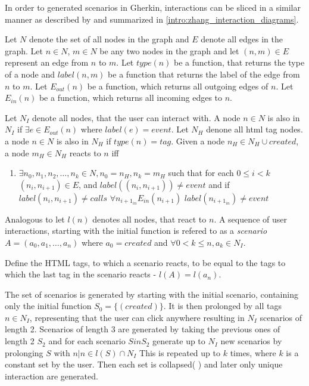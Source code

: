 In order to generated scenarios in Gherkin, interactions can be sliced in a similar manner as described by \textcite{zhang2019scenario} and summarized in \ref{intro:zhang_interaction_diagrams}.

Let $N$ denote the set of all nodes in the graph and $E$ denote all edges in the graph. Let $n \in N$, $m \in N$ be any two nodes in the graph and let $(n, m) \in E $ represent an edge from $n$ to $m$. Let $type(n)$ be a function, that returns the type of a node and $label(n, m)$ be a function that returns the label of the edge from $n$ to $m$. Let $E_{out}(n)$ be a function, which returns all outgoing edges of $n$.
Let $E_{in}(n)$ be a function, which returns all incoming edges to $n$.

Let $N_I$ denote all nodes, that the user can interact with. A node $n \in N$ is also in $N_I$ if $\exists e \in E_{out}(n)$ where $label(e) = event$. Let $N_H$ denone all html tag nodes. a node $n \in N$ is also in $N_H$ if $type(n) = tag$. 
Given a node $n_H \in N_H \cup {created}$, a node $m_H \in N_H$ reacts to $n$ iff
\begin{enumerate}
    \item $\exists n_0,n_1,n_2, \ldots,n_k \in N, n_0=n_H,n_k=m_H$ such that for each $0 \leq i < k  $ $(n_i,n_{i+1}) \in E$, and $label((n_i,n_{i+1}))\neq event$ and if $label(n_i,n_{i+1}) \neq calls$ $\forall n_{i+1_{in}} E_{in}(n_{i+1})$ $label(n_{i+1_{in}}) \neq event$ 
\end{enumerate}

Analogous to \cite{zhang2019scenario} let $l(n)$ denotes all nodes, that react to $n$. A sequence of user interactions, starting with the initial function is refered to as a \textit{scenario} $A=(a_0,a_1,\ldots, a_n)$ where $a_0=created$ and $\forall0 < k \leq n, a_k \in N_I$. 

Define the HTML tags, to which a scenario reacts, to be equal to the tags to which the last tag in the scenario reacts 
- $l(A)=l(a_n)$. 


The set of scenarios is generated by starting with the initial scenario, containing only the initial function $S_0 = \{(created)\}$. It is then prolonged by all tags $n \in N_I$, representing that the user can click anywhere resulting in $N_I$ scenarios of length 2. Scenarios of length 3 are generated by taking the previous ones of length 2 $S_2$ and for each scenario $S in S_2$ generate up to $N_I$ new scenarios by prolonging $S$ with $n | n \in l(S) \cap N_I$
This is repeated up to $k$ times, where $k$ is a constant set by the user. Then each set is collapsed(%
) and later only unique interaction are generated.

